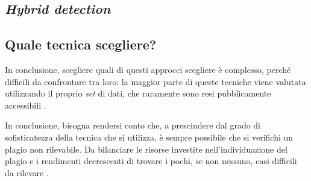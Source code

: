 \subsection{\textit{Hybrid detection}}

\subsection{Quale tecnica scegliere?}
In conclusione, scegliere quali di questi approcci scegliere è complesso, perché difficili da confrontare tra loro: la maggior parte di queste tecniche viene valutata utilizzando il proprio \textit{set} di dati, che raramente sono resi pubblicamente accessibili \cite{karnalim-budi-toba-joy-2019}.

In conclusione, bisogna rendersi conto che, a prescindere dal grado di sofisticatezza della tecnica che si utilizza, è sempre possibile che si verifichi un plagio non rilevabile.
%
Da bilanciare le risorse investite nell'individuazione del plagio e i rendimenti decrescenti di trovare i pochi, se non nessuno, casi difficili da rilevare \cite{joy-99}.


